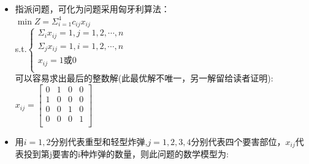 \documentclass[a4paper,20pt]{article}
\begin{document}
\begin{itemize}
        \\则该问题可化为：
        \\$\max Z=(1.25-0.25)x_1+(2.0-0.35)x_2+(2.8-0.5)x_3-\frac{300}{6000}(5x_{11}+5x_{12}+5x_{13}+10x_{21})-\frac{321}{10000}(7x_{12}+7x_{15}+7x_{16}+9x_{22}+12x_3)-\frac{250}{4000}(6x_{11}+6x_{14}+8x_{21}+8x_{22})-\frac{783}{7000}(4x_{12}+4x_{15}+11x_3)-\frac{200}{4000}(7x_{13}+7x_{16})$
        \\s.t.$\left\{\begin{matrix}
            5x_{11}+5x_{12}+5x_{13}+10x_{21} \leq 6000\\
            7x_{14}+7x_{15}+7x_{16}+9x_{22}+12x_3\leq 10000\\
            6x_{11}+6x_4+8x_{21}+8x_{22} \leq 4000\\
            4x_{12}+4x_{25}+11x_3\leq 7000\\
            7x_{13}+7x_{23}\leq 4000\\
            x_1=x_{11}+\cdots+x_{16},x_2=x_{21}+x_{22}\\
            x_{ij}\geq 0,x_i\geq 0\\
        \end{matrix}\right.$
        可以容易求出最后的整数解：(我认为此模型解法比现在网上解法要好一点，计算值更大，契合度更高)
       $x_1=1430.00000000000
       \\x_2=500.000000000000
       \\x_3=324.000000000001
       \\x_{11}=0
       \\x_{12}=858.999999999998
       \\x_{13}=341.000000000002
       \\x_{14}=0
       \\x_{15}=0
       \\x_{16}=229.999999999999
       \\x_{17}=0
       \\x_{18}=500.000000000000$
     \item[5] 指派问题，可化为问题采用匈牙利算法：
     \\$\min Z =\Sigma_{i=1}^{4}c_{ij}x_{ij}$
     \\s.t.$\left\{ \begin{matrix}
        \Sigma_{i}x_{ij}=1,j=1,2,\cdots,n\\
        \Sigma_{j}x_{ij}=1,i=1,2,\cdots,n\\
        x_{ij}=1\mbox{或}0\\
    \end{matrix} \right.$
            \\ 可以容易求出最后的整数解(此最优解不唯一，另一解留给读者证明):
             $x_{ij}=\begin{bmatrix}
                0	&1&	0	&0\\
1	&0	&0	&0\\
0	&0	&1	&0\\
0	&0	&0	&1\\
             \end{bmatrix}
$
    \item[6]用$i=1,2$分别代表重型和轻型炸弹,$j=1,2,3,4$分别代表四个要害部位，$x_{ij}$代表投到第j要害的i种炸弹的数量，则此问题的数学模型为:\\
    

\end{itemize}
\end{document}
